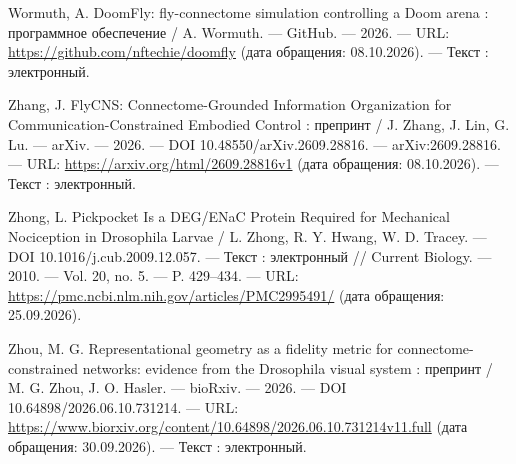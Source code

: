 \begin{list}{}{\setlength{\leftmargin}{10mm}\setlength{\labelwidth}{8mm}\setlength{\labelsep}{2mm}\setlength{\itemsep}{0pt}\setlength{\parsep}{0pt}\setlength{\topsep}{0pt}}
\item[297.] Wormuth, A. DoomFly: fly-connectome simulation controlling a Doom arena : программное обеспечение / A. Wormuth. — GitHub. — 2026. — URL: \url{https://github.com/nftechie/doomfly} (дата обращения: 08.10.2026). — Текст : электронный.
\item[298.] Zhang, J. FlyCNS: Connectome-Grounded Information Organization for Communication-Constrained Embodied Control : препринт / J. Zhang, J. Lin, G. Lu. — arXiv. — 2026. — DOI 10.48550/arXiv.2609.28816. — arXiv:2609.28816. — URL: \url{https://arxiv.org/html/2609.28816v1} (дата обращения: 08.10.2026). — Текст : электронный.
\item[299.] Zhong, L. Pickpocket Is a DEG/ENaC Protein Required for Mechanical Nociception in Drosophila Larvae / L. Zhong, R. Y. Hwang, W. D. Tracey. — DOI 10.1016/j.cub.2009.12.057. — Текст : электронный // Current Biology. — 2010. — Vol. 20, no. 5. — P. 429–434. — URL: \url{https://pmc.ncbi.nlm.nih.gov/articles/PMC2995491/} (дата обращения: 25.09.2026).
\item[300.] Zhou, M. G. Representational geometry as a fidelity metric for connectome-constrained networks: evidence from the Drosophila visual system : препринт / M. G. Zhou, J. O. Hasler. — bioRxiv. — 2026. — DOI 10.64898/2026.06.10.731214. — URL: \url{https://www.biorxiv.org/content/10.64898/2026.06.10.731214v11.full} (дата обращения: 30.09.2026). — Текст : электронный.
\end{list}
\endgroup
